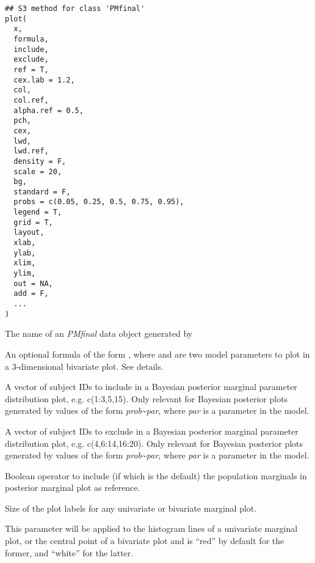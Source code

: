 \documentclass[a4paper]{book}
\begin{document}
%
\begin{Usage}
\begin{verbatim}
## S3 method for class 'PMfinal'
plot(
  x,
  formula,
  include,
  exclude,
  ref = T,
  cex.lab = 1.2,
  col,
  col.ref,
  alpha.ref = 0.5,
  pch,
  cex,
  lwd,
  lwd.ref,
  density = F,
  scale = 20,
  bg,
  standard = F,
  probs = c(0.05, 0.25, 0.5, 0.75, 0.95),
  legend = T,
  grid = T,
  layout,
  xlab,
  ylab,
  xlim,
  ylim,
  out = NA,
  add = F,
  ...
)
\end{verbatim}
\end{Usage}
%
\begin{Arguments}
\begin{ldescription}
\item[\code{x}] The name of an \emph{PMfinal} data object generated by 

\item[\code{formula}] An optional formula of the form , where  and 
are two model parameters to plot in a 3-dimensional bivariate plot.  See details.

\item[\code{include}] A vector of subject IDs to include in a Bayesian posterior marginal parameter 
distribution plot, e.g. c(1:3,5,15).  Only relevant
for Bayesian posterior plots generated by  values of the form \emph{prob\textasciitilde{}par}, where
\emph{par} is a parameter in the model.

\item[\code{exclude}] A vector of subject IDs to exclude in a Bayesian posterior marginal parameter 
distribution plot, e.g. c(4,6:14,16:20). Only relevant
for Bayesian posterior plots generated by  values of the form \emph{prob\textasciitilde{}par}, where
\emph{par} is a parameter in the model.

\item[\code{ref}] Boolean operator to include (if  which is the default) the population marginals
in posterior marginal plot as reference.

\item[\code{cex.lab}] Size of the plot labels for any univariate or bivariate marginal plot.

\item[\code{col}] This parameter will be applied to the histogram lines of a univariate marginal
plot, or the central point of a bivariate plot and is ``red'' by default for the former, 
and ``white'' for the latter.


\end{ldescription}
\end{Arguments}
\end{document}
